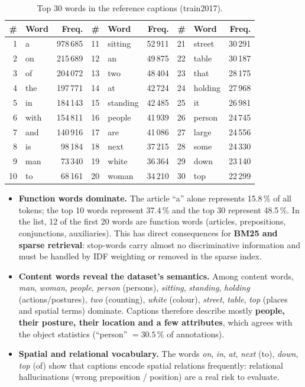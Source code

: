 \documentclass[11pt,a4paper]{article}
\renewcommand{\_}{\textunderscore\allowbreak{}}
\begin{document}
\begin{table}[H]
\centering
\small
\begin{tabular}{@{}rlr@{\hspace{0.8cm}}rlr@{\hspace{0.8cm}}rlr@{}}
\toprule
\# & \textbf{Word} & \textbf{Freq.} & \# & \textbf{Word} & \textbf{Freq.} & \# & \textbf{Word} & \textbf{Freq.}\\
\midrule
1 & a & 978\,685 & 11 & sitting & 52\,911 & 21 & street & 30\,291\\
2 & on & 215\,689 & 12 & an & 49\,875 & 22 & table & 30\,187\\
3 & of & 204\,072 & 13 & two & 48\,404 & 23 & that & 28\,175\\
4 & the & 197\,771 & 14 & at & 42\,724 & 24 & holding & 27\,968\\
5 & in & 184\,143 & 15 & standing & 42\,485 & 25 & it & 26\,981\\
6 & with & 154\,811 & 16 & people & 41\,939 & 26 & person & 24\,745\\
7 & and & 140\,916 & 17 & are & 41\,086 & 27 & large & 24\,556\\
8 & is & 98\,184 & 18 & next & 37\,215 & 28 & some & 24\,330\\
9 & man & 73\,340 & 19 & white & 36\,364 & 29 & down & 23\,140\\
10 & to & 68\,161 & 20 & woman & 34\,210 & 30 & top & 22\,299\\
\bottomrule
\end{tabular}
\caption{Top 30 words in the reference captions (train2017).}
\label{tab:topwords}
\end{table}

\begin{interp}
\begin{itemize}[nosep]
  \item \textbf{Function words dominate.} The article ``a'' alone represents 15.8\,\% of all tokens; the top 10 words represent 37.4\,\% and the top 30 represent 48.5\,\%. In the list, 12 of the first 20 words are function words (articles, prepositions, conjunctions, auxiliaries). This has direct consequences for \textbf{BM25 and sparse retrieval}: stop-words carry almost no discriminative information and must be handled by IDF weighting or removed in the sparse index.
  \item \textbf{Content words reveal the dataset's semantics.} Among content words, \emph{man}, \emph{woman}, \emph{people}, \emph{person} (persons), \emph{sitting}, \emph{standing}, \emph{holding} (actions/postures), \emph{two} (counting), \emph{white} (colour), \emph{street}, \emph{table}, \emph{top} (places and spatial terms) dominate. Captions therefore describe mostly \textbf{people, their posture, their location and a few attributes}, which agrees with the object statistics (``person'' $=30.5\,\%$ of annotations).
  \item \textbf{Spatial and relational vocabulary.} The words \emph{on}, \emph{in}, \emph{at}, \emph{next} (to), \emph{down}, \emph{top} (of) show that captions encode spatial relations frequently: relational hallucinations (wrong preposition / position) are a real risk to evaluate.
\end{itemize}
\end{interp}
\end{document}
